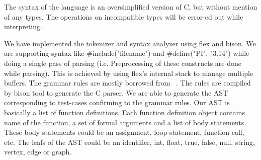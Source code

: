  The syntax of the language is an oversimplified version  of C, but
    without mention of any types. The operations on incompatible types
    will be error-ed out while interpreting.

    We have implemented the tokenizer and syntax analyzer using flex and 
    bison. We are supporting syntax like \#include("filename") and 
    \#define("PI", "3.14") while doing a single pass of parsing  (i.e.  
        Preprocessing of these constructs are done while parsing). This is 
    achieved by using flex's internal stack to manage multiple buffers.
    The grammar rules are mostly borrowed from 
    ~\cite{ANSI}. The rules are compiled 
    by bison tool to generate the C parser. 
    We are able to generate the AST corresponding to test-cases 
    confirming to the grammar rules. Our AST is basically a list of function 
    definitions. Each function definition object contains name of the function, 
    a set of formal arguments and a list of body statements. These body 
    statements could be an assignment, loop-statement, function call, etc.
    The leafs of the AST could be an identifier, int, float, true, false, null, 
    string, vertex, edge or graph.


